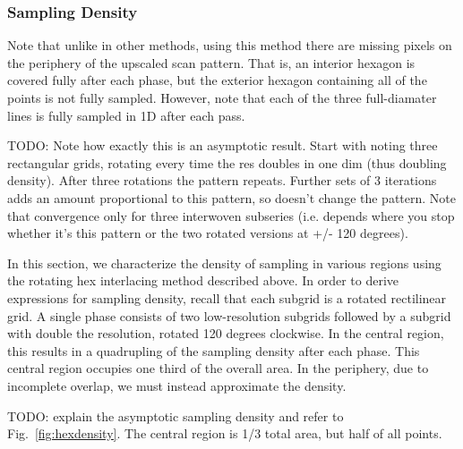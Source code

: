 \documentclass{article}
\newcommand{\reffig}[1]{Fig.~\ref{fig:#1}}
\begin{document}


\subsubsection{Sampling Density}
\label{sec:density}

Note that unlike in other methods, using this method there are missing pixels on the periphery of the upscaled scan pattern.
%
That is, an interior hexagon is covered fully after each phase, but the exterior hexagon containing all of the points is not fully sampled.
%
However, note that each of the three full-diamater lines is fully sampled in 1D after each pass.


TODO: Note how exactly this is an asymptotic result. Start with noting three
rectangular grids, rotating every time the res doubles in one dim (thus doubling
density). After three rotations the pattern repeats. Further sets of 3
iterations adds an amount proportional to this pattern, so doesn't change the
pattern.  Note that convergence only for three interwoven subseries (i.e.
depends where you stop whether it's this pattern or the two rotated versions
at +/- 120 degrees).


In this section, we characterize the density of sampling in various regions using the rotating hex interlacing method described above.
%
In order to derive expressions for sampling density, recall that each subgrid is a rotated rectilinear grid.
%
A single phase consists of two low-resolution subgrids followed by a subgrid with double the resolution, rotated 120 degrees clockwise.
%
In the central region, this results in a quadrupling of the sampling density after each phase.
%
This central region occupies one third of the overall area.
%
In the periphery, due to incomplete overlap, we must instead approximate the density.


TODO: explain the asymptotic sampling density and refer to \reffig{hexdensity}.
%
The central region is 1/3 total area, but half of all points.
\end{document}
